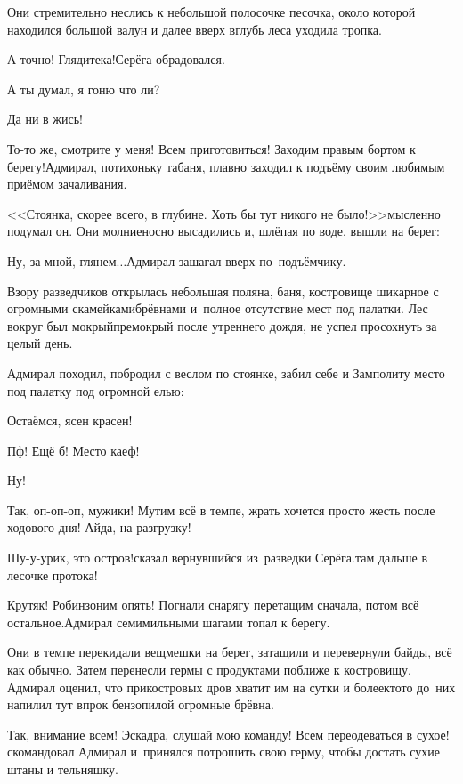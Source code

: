 Они стремительно неслись к небольшой полосочке песочка, около которой находился большой валун и далее вверх вглубь леса уходила тропка.

\diagdash А точно! Глядите\sdash ка!\mdash Серёга обрадовался.

\diagdash А ты думал, я гоню что ли?

\diagdash Да ни в жись!

\diagdash То-то же, смотрите у меня! Всем приготовиться! Заходим правым бортом к берегу!\mdash Адмирал, потихоньку табаня, плавно заходил к подъёму своим любимым приёмом зачаливания.

<<Стоянка, скорее всего, в глубине. Хоть бы тут никого не было!>>\mdash мысленно подумал он. Они молниеносно высадились и, шлёпая по воде, вышли на берег:

\diagdash Ну, за мной, глянем$\ldots$\mdash Адмирал зашагал вверх по~подъёмчику.

Взору разведчиков открылась небольшая поляна, баня, костровище шикарное с огромными скамейками\sdash брёвнами и~полное отсутствие мест под палатки. Лес вокруг был мокрый\sdash премокрый после утреннего дождя, не успел просохнуть за целый день.

Адмирал походил, побродил с веслом по стоянке, забил себе и Замполиту место под палатку под огромной елью:

\diagdash Остаёмся, ясен красен!

\diagdash Пф! Ещё б! Место каеф!

\diagdash Ну!

\diagdash Так, оп-оп-оп, мужики! Мутим всё в темпе, жрать хочется просто жесть после ходового дня! Айда, на разгрузку!

\diagdash Шу-у-урик, это остров!\mdash сказал вернувшийся из~разведки Серёга.\mdash там дальше в лесочке протока!

\diagdash Крутяк! Робинзоним опять! Погнали снарягу перетащим сначала, потом всё остальное.\mdash Адмирал семимильными шагами топал к берегу.

Они в темпе перекидали вещмешки на берег, затащили и перевернули байды, всё как обычно. Затем перенесли гермы с продуктами поближе к костровищу. Адмирал оценил, что прикостровых дров хватит им на сутки и более\mdash кто\sdash то до~них напилил тут впрок бензопилой огромные брёвна.

\diagdash Так, внимание всем! Эскадра, слушай мою команду! Всем переодеваться в сухое!\mdash скомандовал Адмирал и~принялся потрошить свою герму, чтобы достать сухие штаны и тельняшку.

